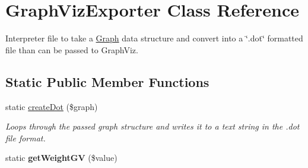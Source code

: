 \hypertarget{classGraphVizExporter}{
\section{GraphVizExporter Class Reference}
\label{classGraphVizExporter}
}


Interpreter file to take a \hyperlink{classGraph}{Graph} data structure and convert into a \char`\"{}.dot\char`\"{} formatted file than can be passed to GraphViz.  


\subsection*{Static Public Member Functions}
\begin{DoxyCompactItemize}
\item 
static \hyperlink{classGraphVizExporter_a63ee3eef62e8e371f65a7b835ff7e03e}{createDot} (\$graph)
\begin{DoxyCompactList}\small\item\em Loops through the passed graph structure and writes it to a text string in the .dot file format. \item\end{DoxyCompactList}\item 
\hypertarget{classGraphVizExporter_ab48d8f07e6c16c1e822cc762b5276b0c}{
static {\bfseries getWeightGV} (\$value)}
\label{classGraphVizExporter_ab48d8f07e6c16c1e822cc762b5276b0c}


\end{DoxyCompactItemize}
